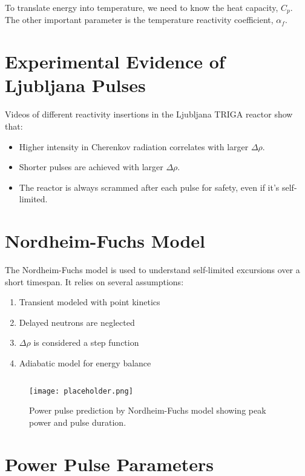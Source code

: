 To translate energy into temperature, we need to know the heat capacity, $C_p$. The other important parameter is the temperature reactivity coefficient, $\alpha_f$.

\section{Experimental Evidence of Ljubljana Pulses}

Videos of different reactivity insertions in the Ljubljana TRIGA reactor show that:
\begin{itemize}
    \item Higher intensity in Cherenkov radiation correlates with larger $\Delta \rho$.
    \item Shorter pulses are achieved with larger $\Delta \rho$.
    \item The reactor is always scrammed after each pulse for safety, even if it’s self-limited.
\end{itemize}

\section{Nordheim-Fuchs Model}

The Nordheim-Fuchs model is used to understand self-limited excursions over a short timespan. It relies on several assumptions:
\begin{enumerate}
    \item Transient modeled with point kinetics
    \item Delayed neutrons are neglected
    \item $\Delta \rho$ is considered a step function
    \item Adiabatic model for energy balance
\end{enumerate}

\begin{equation}
\end{equation}

\begin{figure}[h]
    \centering
        \texttt{[image: placeholder.png]}
    \caption{Power pulse prediction by Nordheim-Fuchs model showing peak power and pulse duration.}
\end{figure}

\section{Power Pulse Parameters}

